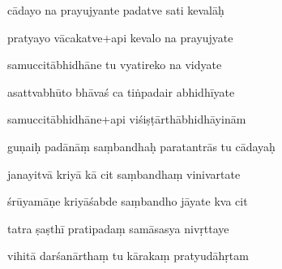 \documentclass[article,12pt,a4paper]{memoir}%
\newcounter{parCount}
\begin{document}
	  
	  \pstart {} cādayo na prayujyante padatve sati kevalāḥ 
	{}
	\pend%
      

	  
	  \pstart \leavevmode%
	pratyayo vācakatve+api kevalo na prayujyate 
	{}
	\pend%
      

	  
	  \pstart {} samuccitābhidhāne tu vyatireko na vidyate 
	{}
	\pend%
      

	  
	  \pstart \leavevmode%
	asattvabhūto bhāvaś ca tiṅpadair abhidhīyate 
	{}
	\pend%
      

	  
	  \pstart {} samuccitābhidhāne+api viśiṣṭārthābhidhāyinām 
	{}
	\pend%
      

	  
	  \pstart \leavevmode%
	guṇaiḥ padānāṃ saṃbandhaḥ paratantrās tu cādayaḥ 
	{}
	\pend%
      

	  
	  \pstart {} janayitvā kriyā kā cit saṃbandhaṃ vinivartate 
	{}
	\pend%
      

	  
	  \pstart \leavevmode%
	śrūyamāṇe kriyāśabde saṃbandho jāyate kva cit 
	{}
	\pend%
      

	  
	  \pstart {} tatra ṣaṣthī pratipadaṃ samāsasya nivṛttaye 
	{}
	\pend%
      

	  
	  \pstart \leavevmode%
	vihitā darśanārthaṃ tu kārakaṃ pratyudāhṛtam 
	{}
	\pend%
      
\end{document}
